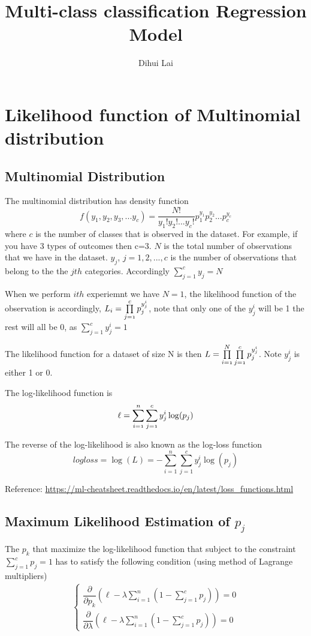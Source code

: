 \documentclass[12pt, oneside]{article}
\title{Multi-class classification Regression Model}
\author{Dihui Lai}
\begin{document}
\maketitle
\tableofcontents

\vspace{.25in}

\section{Likelihood function of Multinomial distribution}

\subsection{Multinomial Distribution}

The multinomial distribution has density function
$${f(y_1, y_2, y_3, ... y_c)=\frac{N!}{y_1! y_2! ... y_c!} p_1^{y_1} p_2^{y_2} ... p_c^{y_c}}$$
where $c$ is the number of classes that is observed in the dataset. For example, if you have 3 types of outcomes then c=3. $N$ is the total number of observations that we have in the dataset. $y_j$, $j=1, 2, ..., c$ is the number of observations that belong to the the $jth$ categories. Accordingly $\sum\limits_{j=1}^c y_j=N$

When we perform $ith$ experiemnt we have $N=1$, the likelihood function of the observation is accordingly, 
$\mathnormal{L_i= \prod \limits_{j=1}^c p_{j}^{y^i_j}}$, note that only one of the $y^i_j$ will be 1 the rest will all be 0, as  $\sum\limits_{j=1}^c y^i_j=1$

The likelihood function for a dataset of size N is then 
$\mathnormal{L= \prod \limits_{i=1}^N\prod \limits_{j=1}^c p_{j}^{y^i_j}}$. Note $y_j^i$ is either 1 or 0.

The log-likelihood function is
\begin{equation}
\mathnormal{\ell=\sum\limits_{i=1}^n \sum\limits_{j=1}^c y_j^i \log(p_j)}
\end{equation}


The reverse of the log-likelihood is also known as the log{-}loss function
$$logloss=\log(L)=-\sum\limits_{i=1}^n \sum\limits_{j=1}^c y_j^i \log(p_j)$$

Reference: \url{https://ml-cheatsheet.readthedocs.io/en/latest/loss_functions.html}

\subsection{Maximum Likelihood Estimation of $p_j$}
The $p_k$ that maximize the log-likelihood function that subject to the constraint $\sum\limits_{j=1}^c p_j=1$ has to satisfy the following condition (using method of Lagrange multipliers)
\begin{align*}
\begin{cases}
\dfrac{\partial}{\partial p_k} \left(\ell-\lambda \sum\limits_{i=1}^n(1-\sum\limits_{j=1}^c p_j)\right)=0\\
\dfrac{\partial}{\partial \lambda} \left(\ell-\lambda \sum\limits_{i=1}^n(1-\sum\limits_{j=1}^c p_j)\right)=0
\end{cases}
\end{align*}
 
\end{document}
